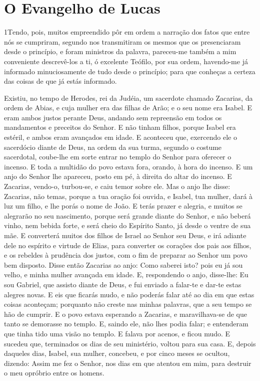 \chapter*{O Evangelho de Lucas}

\lettrine{1} Tendo, pois, muitos empreendido pôr em ordem a
narração dos fatos que entre nós se cumpriram, segundo nos
transmitiram os mesmos que os presenciaram desde o princípio, e
foram ministros da palavra, pareceu-me também a mim conveniente
descrevê-los a ti, ó excelente Teófilo, por sua ordem, havendo-me já
informado minuciosamente de tudo desde o princípio; para que
conheças a certeza das coisas de que já estás informado.

Existiu, no tempo de Herodes, rei da Judéia, um sacerdote chamado
Zacarias, da ordem de Abias, e cuja mulher era das filhas de Arão; e
o seu nome era Isabel. E eram ambos justos perante Deus, andando
sem repreensão em todos os mandamentos e preceitos do Senhor. E
não tinham filhos, porque Isabel era estéril, e ambos eram avançados
em idade. E aconteceu que, exercendo ele o sacerdócio diante de
Deus, na ordem da sua turma, segundo o costume sacerdotal,
coube-lhe em sorte entrar no templo do Senhor para oferecer o
incenso. E toda a multidão do povo estava fora, orando, à
hora do incenso. E um anjo do Senhor lhe apareceu, posto em
pé, à direita do altar do incenso. E Zacarias, vendo-o,
turbou-se, e caiu temor sobre ele. Mas o anjo lhe disse:
Zacarias, não temas, porque a tua oração foi ouvida, e Isabel, tua
mulher, dará à luz um filho, e lhe porás o nome de João. E
terás prazer e alegria, e muitos se alegrarão no seu nascimento,
porque será grande diante do Senhor, e não beberá vinho, nem
bebida forte, e será cheio do Espírito Santo, já desde o ventre de
sua mãe. E converterá muitos dos filhos de Israel ao Senhor
seu Deus, e irá adiante dele no espírito e virtude de Elias,
para converter os corações dos pais aos filhos, e os rebeldes à
prudência dos justos, com o fim de preparar ao Senhor um povo bem
disposto. Disse então Zacarias ao anjo: Como saberei isto?
pois eu já sou velho, e minha mulher avançada em idade. E,
respondendo o anjo, disse-lhe: Eu sou Gabriel, que assisto diante de
Deus, e fui enviado a falar-te e dar-te estas alegres novas.
E eis que ficarás mudo, e não poderás falar até ao dia em que
estas coisas aconteçam; porquanto não creste nas minhas palavras,
que a seu tempo se hão de cumprir. E o povo estava esperando
a Zacarias, e maravilhava-se de que tanto se demorasse no templo.
E, saindo ele, não lhes podia falar; e entenderam que tinha
tido uma visão no templo. E falava por acenos, e ficou mudo.
E sucedeu que, terminados os dias de seu ministério, voltou
para sua casa. E, depois daqueles dias, Isabel, sua mulher,
concebeu, e por cinco meses se ocultou, dizendo: Assim me fez
o Senhor, nos dias em que atentou em mim, para destruir o meu
opróbrio entre os homens.

